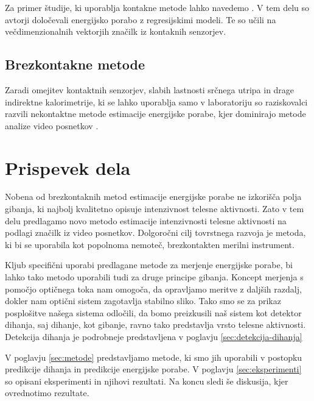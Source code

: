 Za primer študije, ki uporablja kontakne metode lahko navedemo \cite{gjoreski2015context}. V tem delu so avtorji določevali energijsko porabo z regresijskimi modeli. Te so učili na večdimenzionalnih vektorjih značilk iz kontaknih senzorjev.





\subsection{Brezkontakne metode}

Zaradi omejitev kontaktnih senzorjev, slabih lastnosti srčnega utripa in drage indirektne kalorimetrije, ki se lahko uporablja samo v laboratoriju so raziskovalci razvili nekontaktne metode estimacije energijske porabe, kjer dominirajo metode analize video posnetkov \cite{botton2011energy,osgnach2010energy,silva2015assessing,peker2004framework,nathan2015estimating}. 




\section{Prispevek dela}
Nobena od brezkontaknih metod estimacije energijske porabe ne izkorišča polja gibanja, ki najbolj kvalitetno opisuje intenzivnost telesne aktivnosti. Zato v tem delu predlagamo novo metodo estimacije intenzivnosti telesne aktivnosti na podlagi značilk iz video posnetkov. Dolgoročni cilj tovrstnega razvoja je metoda, ki bi se uporabila kot popolnoma nemoteč, brezkontakten merilni instrument.

Kljub specifični uporabi predlagane metode za merjenje energijske porabe, bi lahko tako metodo uporabili tudi za druge principe gibanja. Koncept merjenja s pomočjo optičnega toka nam omogoča, da opravljamo meritve z daljših razdalj, dokler nam optični sistem zagotavlja stabilno sliko. Tako smo se za prikaz posplošitve našega sistema odločili, da bomo preizkusili naš sistem kot detektor dihanja, saj dihanje, kot gibanje, ravno tako predstavlja vrsto telesne aktivnosti. Detekcija dihanja je podrobneje predstavljena v poglavju \ref{sec:detekcija-dihanja}

V poglavju \ref{sec:metode}  predstavljamo metode, ki smo jih uporabili v postopku predikcije dihanja in predikcije energijske porabe. V poglavju \ref{sec:eksperimenti} so opisani eksperimenti in njihovi rezultati. Na koncu sledi še diskusija, kjer ovrednotimo rezultate. 



